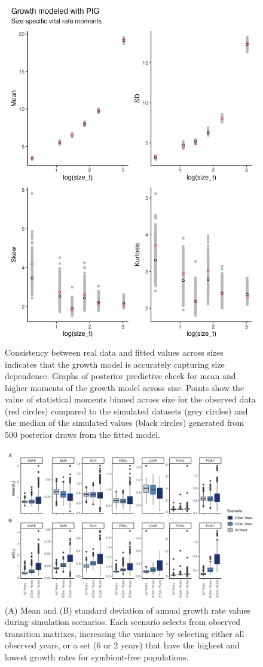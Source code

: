 \documentclass[9pt,twoside,lineno]{pnas-new}
\begin{document}
\newpage
\begin{figure}
	\centering
	\includegraphics[width=.6\linewidth]{size_ppc_plot.png}
	\caption{Consistency between real data and fitted values across sizes indicates that the growth model is accurately capturing size dependence. Graphs of posterior predictive check for mean and higher moments of the growth model across size. Points show the value of statistical moments binned across size for the observed data (red circles) compared to the simulated datasets (grey circles) and the median of the simulated values (black circles) generated from 500 posterior draws from the fitted model. }
\end{figure}

\newpage
\begin{figure}
	\centering
	\includegraphics[width=\linewidth]{sim_boxplots.png}
	\caption{(A) Mean and (B) standard deviation of annual growth rate values during simulation scenarios. Each scenario selects from observed transition matrixes, increasing the variance by selecting either all observed years, or a set (6 or 2 years) that have the highest and lowest growth rates for symbiont-free populations.}
\end{figure}
\end{document}

